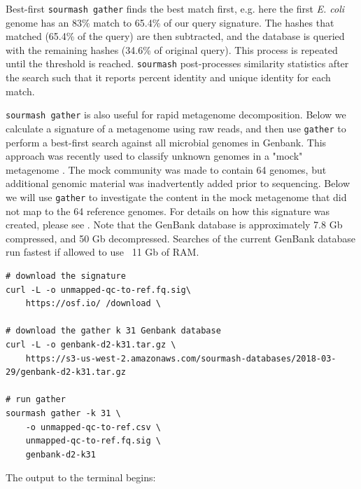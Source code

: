 \documentclass[10pt,a4paper,twocolumn]{article}
\begin{document}
Best-first \lstinline{sourmash gather} finds the best match first, e.g. here the first \textit{E. coli} genome has an 83\% match to 65.4\% of our query signature. The hashes that matched (65.4\% of the query) are then subtracted, and the database is queried with the remaining hashes (34.6\% of original query). This process is repeated until the threshold is reached. \lstinline{sourmash} post-processes similarity statistics after the search such that it reports percent identity and unique identity for each match.

\lstinline{sourmash gather} is also useful for rapid metagenome decomposition. Below we calculate a signature of a metagenome using raw reads, and then use \lstinline{gather} to perform a best-first search against all microbial genomes in Genbank. This approach was recently used to classify unknown genomes in a "mock" metagenome \cite{Shakya2013}. The mock community was made to contain 64 genomes, but additional genomic material was inadvertently added prior to sequencing. Below we will use \lstinline{gather} to investigate the content in the mock metagenome that did not map to the 64 reference genomes. For details on how this signature was created, please see \cite{Awad2017}. Note that the GenBank database is approximately 7.8 Gb compressed, and 50 Gb decompressed. Searches of the current GenBank database run fastest if allowed to use ~11 Gb of RAM.

\begin{lstlisting}
# download the signature
curl -L -o unmapped-qc-to-ref.fq.sig\ 
    https://osf.io/ /download \ 

# download the gather k 31 Genbank database
curl -L -o genbank-d2-k31.tar.gz \ 
    https://s3-us-west-2.amazonaws.com/sourmash-databases/2018-03-29/genbank-d2-k31.tar.gz
    
# run gather
sourmash gather -k 31 \ 
    -o unmapped-qc-to-ref.csv \ 
    unmapped-qc-to-ref.fq.sig \ 
    genbank-d2-k31
\end{lstlisting}

The output to the terminal begins:
\end{document}
